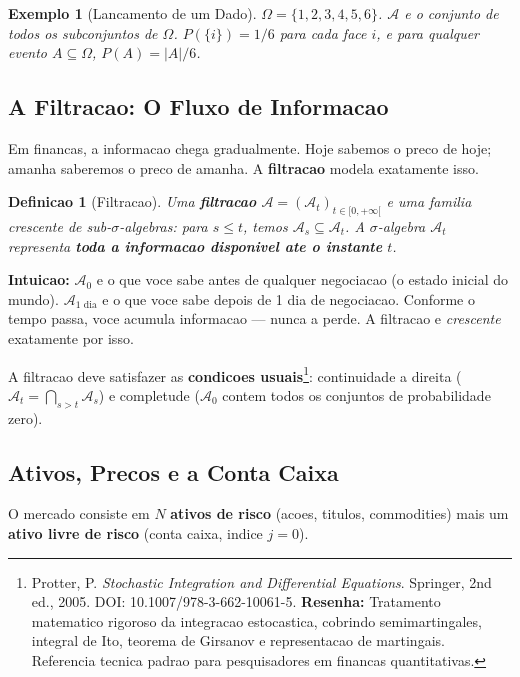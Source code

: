 \documentclass[12pt,a4paper]{article}
\newtheorem{defi}[teo]{Definicao}
\newtheorem{ex}{Exemplo}[section]
\theoremstyle{remark}
\begin{document}
\begin{ex}[Lancamento de um Dado]
$\Omega = \{1,2,3,4,5,6\}$. $\mathcal{A}$ e o conjunto de todos os subconjuntos
de $\Omega$. $P(\{i\}) = 1/6$ para cada face $i$, e para qualquer evento
$A \subseteq \Omega$, $P(A) = |A|/6$.
\end{ex}

\subsection{A Filtracao: O Fluxo de Informacao}

Em financas, a informacao chega gradualmente. Hoje sabemos o preco de hoje;
amanha saberemos o preco de amanha. A \textbf{filtracao} modela exatamente isso.

\begin{defi}[Filtracao]
Uma \textbf{filtracao} $\mathcal{A} = (\mathcal{A}_t)_{t\in[0,+\infty[}$ e uma
familia crescente de sub-$\sigma$-algebras: para $s \leq t$, temos
$\mathcal{A}_s \subseteq \mathcal{A}_t$. A $\sigma$-algebra $\mathcal{A}_t$
representa \textbf{toda a informacao disponivel ate o instante} $t$.
\end{defi}

\textbf{Intuicao:} $\mathcal{A}_0$ e o que voce sabe antes de qualquer negociacao
(o estado inicial do mundo). $\mathcal{A}_{1\text{ dia}}$ e o que voce sabe
depois de 1 dia de negociacao. Conforme o tempo passa, voce acumula informacao —
nunca a perde. A filtracao e \textit{crescente} exatamente por isso.

A filtracao deve satisfazer as \textbf{condicoes usuais}\footnote{Protter, P.
\textit{Stochastic Integration and Differential Equations}. Springer, 2nd ed.,
2005. DOI: 10.1007/978-3-662-10061-5. \textbf{Resenha:} Tratamento matematico
rigoroso da integracao estocastica, cobrindo semimartingales, integral de Ito,
teorema de Girsanov e representacao de martingais. Referencia tecnica padrao
para pesquisadores em financas quantitativas.}:
continuidade a direita ($\mathcal{A}_t = \bigcap_{s>t}\mathcal{A}_s$) e
completude ($\mathcal{A}_0$ contem todos os conjuntos de probabilidade zero).

\subsection{Ativos, Precos e a Conta Caixa}

O mercado consiste em $N$ \textbf{ativos de risco} (acoes, titulos, commodities)
mais um \textbf{ativo livre de risco} (conta caixa, indice $j=0$).
\end{document}
